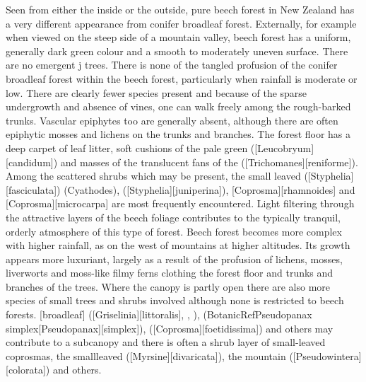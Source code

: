 Seen from either the inside or the outside, pure beech forest in New Zealand has a very different appearance from conifer broadleaf forest.
Externally, for example when viewed on the steep side of a mountain valley, beech forest has a uniform, generally dark green colour and a smooth to moderately uneven surface.
There are no emergent j trees.
There is none of the tangled profusion of the conifer broadleaf forest within the beech forest, particularly when rainfall is moderate or low.
There are clearly fewer species present and because of the sparse undergrowth and absence of vines, one can walk freely among the rough-barked trunks.
Vascular epiphytes too are generally absent, although there are often epiphytic mosses and lichens on the trunks and branches.
The forest floor has a deep carpet of leaf litter, soft cushions of the pale green  ([Leucobryum][candidum]) and masses of the translucent fans of the  ([Trichomanes][reniforme]).
Among the scattered shrubs which may be present, the small leaved  ([Styphelia][fasciculata]) (Cyathodes),  ([Styphelia][juniperina]), [Coprosma][rhamnoides] and [Coprosma][microcarpa] are most frequently encountered.
Light filtering through the attractive layers of the beech foliage contributes to the typically tranquil, orderly atmosphere of this type of forest.
Beech forest becomes more complex with higher rainfall, as on the west of mountains at higher altitudes.
Its growth appears more luxuriant, largely as a result of the profusion of lichens, mosses, liverworts and moss-like filmy ferns clothing the forest floor and trunks and branches of the trees.
Where the canopy is partly open there are also more species of small trees and shrubs involved although none is restricted to beech forests.
[broadleaf] ([Griselinia][littoralis], , ),  (BotanicRef{Pseudopanax simplex}[Pseudopanax][simplex]),  ([Coprosma][foetidissima]) and others may contribute to a subcanopy and there is often a shrub layer of small-leaved coprosmas, the smallleaved  ([Myrsine][divaricata]), the mountain  ([Pseudowintera][colorata]) and others.

